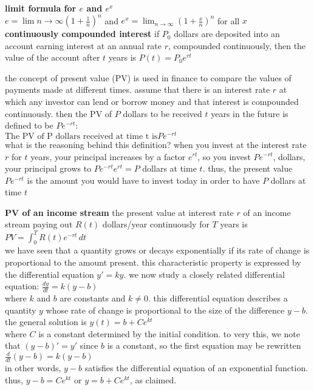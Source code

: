 \documentclass{article}
\begin{document}
\textbf{limit formula for $e$ and $e^x$}\\
$e = \lim{n \to \infty}(1 + \frac{1}{n})^n$ and $e^x = \lim_{n \to \infty}(1 + \frac{x}{n})^n$ for all $x$\\

\textbf{continuously compounded interest} if $P_0$ dollars are deposited into an account earning interest at an annual rate $r$, compounded continuously, then the value of the account after $t$ years is $P(t) = P_0e^{rt}$

the concept of present value (PV) is used in finance to compare the values of payments made at different times. assume that there is an interest rate $r$ at which any investor can lend or borrow money and that interest is compounded continuously. then the PV of $P$ dollars to be received $t$ years in the future is defined to be $Pe^{-rt}$:\\
$\text{The PV of P dollars received at time t is} Pe^{-rt}$\\
what is the reasoning behind this definition? when you invest at the interest rate $r$ for $t$ years, your principal increases by a factor $e^{rt}$, so you invest $Pe^{-rt}$, dollars, your principal grows to $Pe^{-rt}e^{rt} = P$ dollars at time $t$. thus, the present value $Pe^{-rt}$ is the amount you would have to invest today in order to have $P$ dollars at time $t$

\textbf{PV of an income stream} the present value at interest rate $r$ of an income stream paying out $R(t)$ dollars/year continuously for $T$ years is $PV = \int_{0}^{T}R(t)e^{-rt}\,dt$\\

we have seen that a quantity grows or decays exponentially if its rate of change is proportional to the amount present. this characteristic property is expressed by the differential equation $y' = ky$. we now study a closely related differential equation: $\frac{dy}{dt} = k(y - b)$\\ where $k$ and $b$ are constants and $k \neq 0$. this differential equation describes a quantity $y$ whose rate of change is proportional to the size of the difference $y - b$. the general solution is $y(t) = b + Ce^{kt}$\\ where $C$ is a constant determined by the initial condition. to very this, we note that $(y - b)' = y'$ since $b$ is a constant, so the first equation may be rewritten $\frac{d}{dt}(y - b) = k(y - b)$\\ in other words, $y - b$ satisfies the differential equation of an exponential function. thus, $y - b = Ce^{kt}$ or $y = b + Ce^{kt}$, as claimed.
\end{document}
